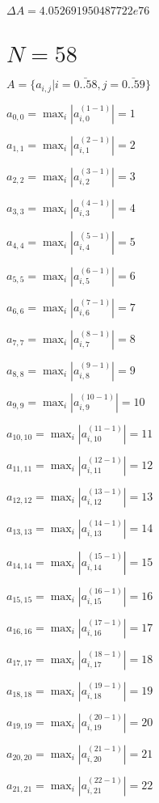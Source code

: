\documentclass[a4paper,12pt]{article}
\begin{document}
$\Delta A = 4.052691950487722e76$



\section{ $N = 58$ }
$A = \{ a _{ i, j } | i = \bar { 0..58 }, j = \bar { 0..59 } \}$

$a _{ 0, 0 } =  \max _i |a _{ i, 0 } ^{ (1 - 1) } | = 1$

$a _{ 1, 1 } =  \max _i |a _{ i, 1 } ^{ (2 - 1) } | = 2$

$a _{ 2, 2 } =  \max _i |a _{ i, 2 } ^{ (3 - 1) } | = 3$

$a _{ 3, 3 } =  \max _i |a _{ i, 3 } ^{ (4 - 1) } | = 4$

$a _{ 4, 4 } =  \max _i |a _{ i, 4 } ^{ (5 - 1) } | = 5$

$a _{ 5, 5 } =  \max _i |a _{ i, 5 } ^{ (6 - 1) } | = 6$

$a _{ 6, 6 } =  \max _i |a _{ i, 6 } ^{ (7 - 1) } | = 7$

$a _{ 7, 7 } =  \max _i |a _{ i, 7 } ^{ (8 - 1) } | = 8$

$a _{ 8, 8 } =  \max _i |a _{ i, 8 } ^{ (9 - 1) } | = 9$

$a _{ 9, 9 } =  \max _i |a _{ i, 9 } ^{ (10 - 1) } | = 10$

$a _{ 10, 10 } =  \max _i |a _{ i, 10 } ^{ (11 - 1) } | = 11$

$a _{ 11, 11 } =  \max _i |a _{ i, 11 } ^{ (12 - 1) } | = 12$

$a _{ 12, 12 } =  \max _i |a _{ i, 12 } ^{ (13 - 1) } | = 13$

$a _{ 13, 13 } =  \max _i |a _{ i, 13 } ^{ (14 - 1) } | = 14$

$a _{ 14, 14 } =  \max _i |a _{ i, 14 } ^{ (15 - 1) } | = 15$

$a _{ 15, 15 } =  \max _i |a _{ i, 15 } ^{ (16 - 1) } | = 16$

$a _{ 16, 16 } =  \max _i |a _{ i, 16 } ^{ (17 - 1) } | = 17$

$a _{ 17, 17 } =  \max _i |a _{ i, 17 } ^{ (18 - 1) } | = 18$

$a _{ 18, 18 } =  \max _i |a _{ i, 18 } ^{ (19 - 1) } | = 19$

$a _{ 19, 19 } =  \max _i |a _{ i, 19 } ^{ (20 - 1) } | = 20$

$a _{ 20, 20 } =  \max _i |a _{ i, 20 } ^{ (21 - 1) } | = 21$

$a _{ 21, 21 } =  \max _i |a _{ i, 21 } ^{ (22 - 1) } | = 22$
\end{document}
